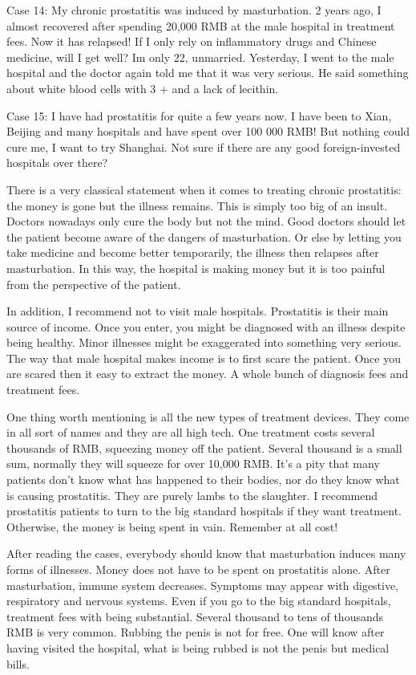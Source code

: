 \documentclass[
]{book}
\begin{document}
Case 14: My chronic prostatitis was induced by masturbation. 2 years ago, I almost recovered after spending 20,000 RMB at the male hospital in treatment fees. Now it has relapsed! If I only rely on inflammatory drugs and Chinese medicine, will I get well? Im only 22, unmarried. Yesterday, I went to the male hospital and the doctor again told me that it was very serious. He said something about white blood cells with 3 + and a lack of lecithin.

Case 15: I have had prostatitis for quite a few years now. I have been to Xian, Beijing and many hospitals and have spent over 100 000 RMB! But nothing could cure me, I want to try Shanghai. Not sure if there are any good foreign-invested hospitals over there?

There is a very classical statement when it comes to treating chronic prostatitis: the money is gone but the illness remains. This is simply too big of an insult. Doctors nowadays only cure the body but not the mind. Good doctors should let the patient become aware of the dangers of masturbation. Or else by letting you take medicine and become better temporarily, the illness then relapses after masturbation. In this way, the hospital is making money but it is too painful from the perspective of the patient.

In addition, I recommend not to visit male hospitals. Prostatitis is their main source of income. Once you enter, you might be diagnosed with an illness despite being healthy. Minor illnesses might be exaggerated into something very serious. The way that male hospital makes income is to first scare the patient. Once you are scared then it easy to extract the money. A whole bunch of diagnosis fees and treatment fees.

One thing worth mentioning is all the new types of treatment devices. They come in all sort of names and they are all high tech. One treatment costs several thousands of RMB, squeezing money off the patient. Several thousand is a small sum, normally they will squeeze for over 10,000 RMB. It's a pity that many patients don't know what has happened to their bodies, nor do they know what is causing prostatitis. They are purely lambs to the slaughter. I recommend prostatitis patients to turn to the big standard hospitals if they want treatment. Otherwise, the money is being spent in vain. Remember at all cost!

After reading the cases, everybody should know that masturbation induces many forms of illnesses. Money does not have to be spent on prostatitis alone. After masturbation, immune system decreases. Symptoms may appear with digestive, respiratory and nervous systems. Even if you go to the big standard hospitals, treatment fees with being substantial. Several thousand to tens of thousands RMB is very common. Rubbing the penis is not for free. One will know after having visited the hospital, what is being rubbed is not the penis but medical bills.
\end{document}
